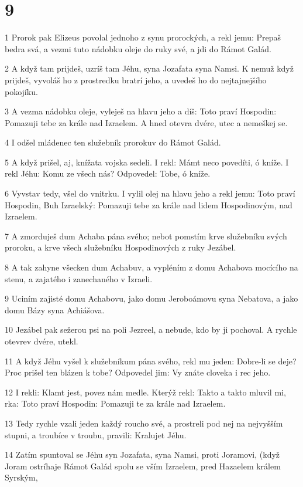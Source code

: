 \chapter{9}

\par 1 Prorok pak Elizeus povolal jednoho z synu prorockých, a rekl jemu: Prepaš bedra svá, a vezmi tuto nádobku oleje do ruky své, a jdi do Rámot Galád.
\par 2 A když tam prijdeš, uzríš tam Jéhu, syna Jozafata syna Namsi. K nemuž když prijdeš, vyvoláš ho z prostredku bratrí jeho, a uvedeš ho do nejtajnejšího pokojíku.
\par 3 A vezma nádobku oleje, vyleješ na hlavu jeho a díš: Toto praví Hospodin: Pomazuji tebe za krále nad Izraelem. A hned otevra dvére, utec a nemeškej se.
\par 4 I odšel mládenec ten služebník prorokuv do Rámot Galád.
\par 5 A když prišel, aj, knížata vojska sedeli. I rekl: Mámt neco povedíti, ó kníže. I rekl Jéhu: Komu ze všech nás? Odpovedel: Tobe, ó kníže.
\par 6 Vyvstav tedy, všel do vnitrku. I vylil olej na hlavu jeho a rekl jemu: Toto praví Hospodin, Buh Izraelský: Pomazuji tebe za krále nad lidem Hospodinovým, nad Izraelem.
\par 7 A zmorduješ dum Achaba pána svého; nebot pomstím krve služebníku svých proroku, a krve všech služebníku Hospodinových z ruky Jezábel.
\par 8 A tak zahyne všecken dum Achabuv, a vypléním z domu Achabova mocícího na stenu, a zajatého i zanechaného v Izraeli.
\par 9 Uciním zajisté domu Achabovu, jako domu Jeroboámovu syna Nebatova, a jako domu Bázy syna Achiášova.
\par 10 Jezábel pak sežerou psi na poli Jezreel, a nebude, kdo by ji pochoval. A rychle otevrev dvére, utekl.
\par 11 A když Jéhu vyšel k služebníkum pána svého, rekl mu jeden: Dobre-li se deje? Proc prišel ten blázen k tobe? Odpovedel jim: Vy znáte cloveka i rec jeho.
\par 12 I rekli: Klamt jest, povez nám medle. Kterýž rekl: Takto a takto mluvil mi, rka: Toto praví Hospodin: Pomazuji te za krále nad Izraelem.
\par 13 Tedy rychle vzali jeden každý roucho své, a prostreli pod nej na nejvyšším stupni, a troubíce v troubu, pravili: Kralujet Jéhu.
\par 14 Zatím spuntoval se Jéhu syn Jozafata, syna Namsi, proti Joramovi, (když Joram ostríhaje Rámot Galád spolu se vším Izraelem, pred Hazaelem králem Syrským,
